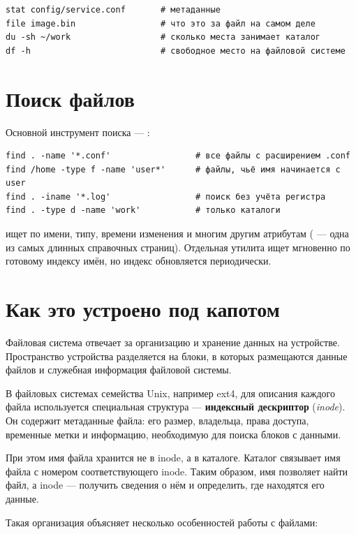 \begin{verbatim}
stat config/service.conf       # метаданные
file image.bin                 # что это за файл на самом деле
du -sh ~/work                  # сколько места занимает каталог
df -h                          # свободное место на файловой системе
\end{verbatim}

\section{Поиск файлов}

Основной инструмент поиска --- :
\begin{verbatim}
find . -name '*.conf'                 # все файлы с расширением .conf
find /home -type f -name 'user*'      # файлы, чьё имя начинается с user
find . -iname '*.log'                 # поиск без учёта регистра
find . -type d -name 'work'           # только каталоги
\end{verbatim}

 ищет по имени, типу, времени изменения и многим другим
атрибутам ( --- одна из самых длинных справочных страниц).
Отдельная утилита  ищет мгновенно по готовому индексу
имён, но индекс обновляется периодически.

\section{Как это устроено под капотом}

Файловая система отвечает за организацию и хранение данных
на устройстве. Пространство устройства разделяется на блоки,
в которых размещаются данные файлов и служебная информация
файловой системы.

В файловых системах семейства Unix, например ext4,
для описания каждого файла используется специальная
структура --- \textbf{индексный дескриптор}
(\emph{inode}). Он содержит метаданные файла:
его размер, владельца, права доступа, временные метки
и информацию, необходимую для поиска блоков с данными.

При этом имя файла хранится не в inode, а в каталоге.
Каталог связывает имя файла с номером соответствующего
inode. Таким образом, имя позволяет найти файл,
а inode --- получить сведения о нём и определить,
где находятся его данные.

Такая организация объясняет несколько особенностей
работы с файлами:

